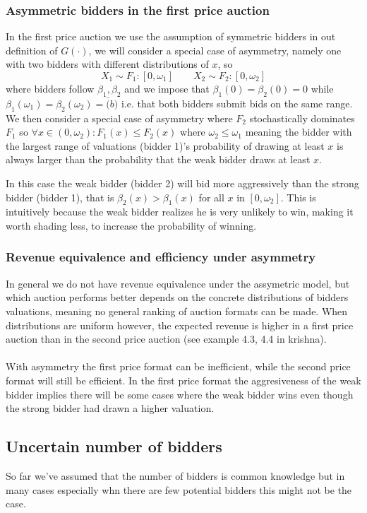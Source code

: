 \subsubsection{Asymmetric bidders in the first price auction}
In the first price auction we use the assumption of symmetric bidders in out definition of $G(\cdot)$, we will consider a special case of asymmetry, namely one with two bidders with different distributions of $x$, so
\begin{equation}
 X_1 \sim F_1:[0,\omega_1] \qquad X_2 \sim F_2:[0,\omega_2]
\end{equation}
where bidders follow $\beta_1, \beta_2$ and we impose that $\beta_1(0)=\beta_2(0)=0$ while $\beta_1(\omega_1)=\beta_2(\omega_2)=\bar(b)$ i.e. that both bidders submit bids on the same range. We then consider a special case of asymmetry where $F_2$ stochastically dominates $F_1$ so $\forall x \in(0, \omega_2):F_1(x)\leq F_2(x)$ where $\omega_2 \leq \omega_1$ meaning the bidder with the largest range of valuations (bidder 1)'s probability of drawing at least $x$ is always larger than the probability that the weak bidder draws at least $x$.

In this case the weak bidder (bidder 2) will bid more aggressively than the strong bidder (bidder 1), that is $\beta_2(x)>\beta_1(x)$ for all $x$ in $[0, \omega_2]$. This is intuitively because the weak bidder realizes he is very unlikely to win, making it worth shading less, to increase the probability of winning.

\subsubsection{Revenue equivalence and efficiency under asymmetry}
In general we do not have revenue equivalence under the assymetric model, but which auction performs better depends on the concrete distributions of bidders valuations, meaning no general ranking of auction formats can be made. When distributions are uniform however, the expected revenue is higher in a first price auction than in the second price auction (see example 4.3, 4.4 in krishna).
\\ \\
With asymmetry the first price format can be inefficient, while the second price format will still be efficient. In the first price format the aggresiveness of the weak bidder implies there will be some cases where the weak bidder wins even though the strong bidder had drawn a higher valuation.


\subsection{Uncertain number of bidders}
So far we've assumed that the number of bidders is common knowledge but in many cases especially whn there are few potential bidders this might not be the case.

